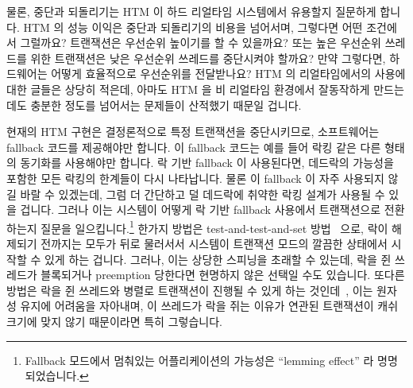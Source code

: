 물론, 중단과 되돌리기는 HTM 이 하드 리얼타임 시스템에서 유용할지 질문하게
합니다.
HTM 의 성능 이익은 중단과 되돌리기의 비용을 넘어서며, 그렇다면 어떤 조건에서
그럴까요?
트랜잭션은 우선순위 높이기를 할 수 있을까요?
또는 높은 우선순위 쓰레드를 위한 트랜잭션은 낮은 우선순위 쓰레드를 중단시켜야
할까요?
만약 그렇다면, 하드웨어는 어떻게 효율적으로 우선순위를 전달받나요?
HTM 의 리얼타임에서의 사용에 대한 글들은 상당히 적은데, 아마도 HTM 을 비
리얼타임 환경에서 잘동작하게 만드는데도 충분한 정도를 넘어서는 문제들이
산적했기 때문일 겁니다.

\iffalse

Of course, aborts and rollbacks raise the question of whether HTM can
be useful for hard real-time systems.
Do the performance benefits of HTM outweigh the costs of the aborts
and rollbacks, and if so under what conditions?
Can transactions use priority boosting?
Or should transactions for high-priority threads instead preferentially
abort those of low-priority threads?
If so, how is the hardware efficiently informed of priorities?
The literature on real-time use of HTM is quite sparse, perhaps
because there are more than enough problems in making HTM work well in
non-real-time environments.

\fi

현재의 HTM 구현은 결정론적으로 특정 트랜잭션을 중단시키므로, 소프트웨어는
fallback 코드를 제공해야만 합니다.
이 fallback 코드는 예를 들어 락킹 같은 다른 형태의 동기화를 사용해야만 합니다.
락 기반 fallback 이 사용된다면, 데드락의 가능성을 포함한 모든 락킹의 한계들이
다시 나타납니다.
물론 이 fallback 이 자주 사용되지 않길 바랄 수 있겠는데, 그럼 더 간단하고 덜
데드락에 취약한 락킹 설계가 사용될 수 있을 겁니다.
그러나 이는 시스템이 어떻게 락 기반 fallback 사용에서 트랜잭션으로 전환하는지
질문을 일으킵니다.\footnote{
	Fallback 모드에서 멈춰있는 어플리케이션의 가능성은 ``lemming effect''
	라 명명되었습니다.}
한가지 방법은 test-and-test-and-set 방법~\cite{Martinez02a} 으로, 락이 해제되기
전까지는 모두가 뒤로 물러서서 시스템이 트랜잭션 모드의 깔끔한 상태에서 시작할
수 있게 하는 겁니다.
그러나, 이는 상당한 스피닝을 초래할 수 있는데, 락을 쥔 쓰레드가 블록되거나
preemption 당한다면 현명하지 않은 선택일 수도 있습니다.
또다른 방법은 락을 쥔 쓰레드와 병렬로 트랜잭션이 진행될 수 있게 하는
것인데~\cite{Martinez02a}, 이는 원자성 유지에 어려움을 자아내며, 이 쓰레드가
락을 쥐는 이유가 연관된 트랜잭션이 캐쉬 크기에 맞지 않기 때문이라면 특히
그렇습니다.

\iffalse

